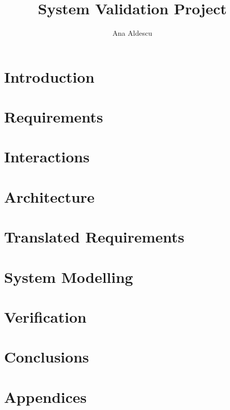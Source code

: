 \documentclass[a4paper,11pt]{report}
\title{System Validation Project}
\author{Ana Aldescu}
\begin{document}
	\newenvironment{frontmatter}{\pagenumbering{roman}}{\newpage {}}
	\begin{frontmatter}
		
		\newpage
		
		\tableofcontents
	\end{frontmatter}
	
	\chapter{Introduction}
	\label{chap:intro}
	
	\newpage
	
	\chapter{Requirements}
	\label{chap:reqs}
	
	\newpage
	
	\chapter{Interactions}
	\label{chap:interact}
	
	\newpage
		 
	\chapter{Architecture}
	\label{chap:arch}
			 
	\newpage
	
	
	\chapter{Translated Requirements}
	\label{chap:transReq}
	
	\newpage
	   	
	\chapter{System Modelling}
	\label{chap:model}
	
	\newpage
	
	\chapter{Verification}
	\label{chap:verif}
	
	\newpage
	
	\chapter{Conclusions}
	\label{chap:concl}
	
	\newpage
    	
	\chapter{Appendices}
	\label{chap:appen}
	
	\newpage
	

%
%
\end{document}
